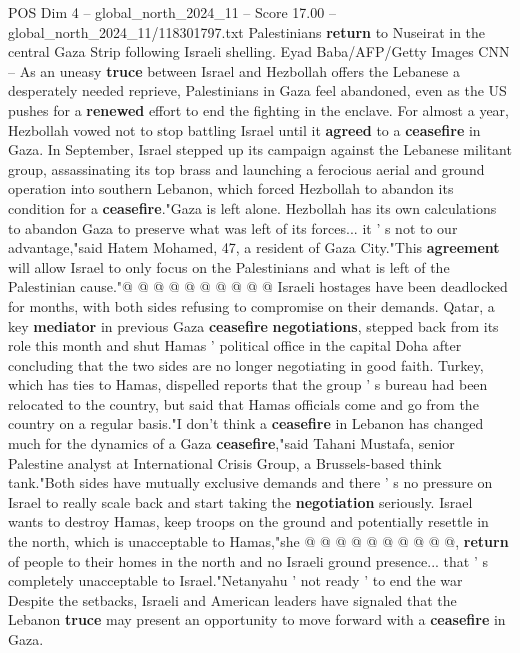 \begin{textsample}{POS Dim 4 – global\_north\_2024\_11 – Score 17.00 – global\_north\_2024\_11/118301797.txt}  \label{ex:f4_pos_297}
Palestinians \textbf{return} to Nuseirat in the central Gaza Strip following Israeli shelling.
Eyad Baba/AFP/Getty Images CNN -- As an uneasy \textbf{truce} between Israel and Hezbollah offers the Lebanese a desperately needed reprieve, Palestinians in Gaza feel abandoned, even as the US pushes for a \textbf{renewed} effort to end the fighting in the enclave.
For almost a year, Hezbollah vowed not to stop battling Israel until it \textbf{agreed} to a \textbf{ceasefire} in Gaza.
In September, Israel stepped up its campaign against the Lebanese militant group, assassinating its top brass and launching a ferocious aerial and ground operation into southern Lebanon, which forced Hezbollah to abandon its condition for a \textbf{ceasefire}."Gaza is left alone.
Hezbollah has its own calculations to abandon Gaza to preserve what was left of its forces... it ' s not to our advantage,"said Hatem Mohamed, 47, a resident of Gaza City."This \textbf{agreement} will allow Israel to only focus on the Palestinians and what is left of the Palestinian cause."@ @ @ @ @ @ @ @ @ @ Israeli hostages have been deadlocked for months, with both sides refusing to compromise on their demands.
Qatar, a key \textbf{mediator} in previous Gaza \textbf{ceasefire} \textbf{negotiations}, stepped back from its role this month and shut Hamas ' political office in the capital Doha after concluding that the two sides are no longer negotiating in good faith.
Turkey, which has ties to Hamas, dispelled reports that the group ' s bureau had been relocated to the country, but said that Hamas officials come and go from the country on a regular basis."I don't think a \textbf{ceasefire} in Lebanon has changed much for the dynamics of a Gaza \textbf{ceasefire},"said Tahani Mustafa, senior Palestine analyst at International Crisis Group, a Brussels-based think tank."Both sides have mutually exclusive demands and there ' s no pressure on Israel to really scale back and start taking the \textbf{negotiation} seriously.
Israel wants to destroy Hamas, keep troops on the ground and potentially resettle in the north, which is unacceptable to Hamas,"she @ @ @ @ @ @ @ @ @ @, \textbf{return} of people to their homes in the north and no Israeli ground presence... that ' s completely unacceptable to Israel."Netanyahu ' not ready ' to end the war Despite the setbacks, Israeli and American leaders have signaled that the Lebanon \textbf{truce} may present an opportunity to move forward with a \textbf{ceasefire} in Gaza.

\end{textsample}
